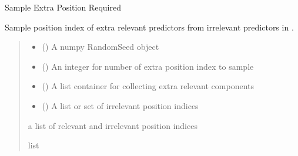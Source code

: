 \documentclass[letterpaper,10pt,english]{sphinxmanual}
\begin{document}

\begin{fulllineitems}
\label{\detokenize{Utilities:pysimrel.utilities.sample_extra_pos}}
\pysigstartsignatures
{}
\pysigstopsignatures
\sphinxAtStartPar
Sample Extra Position Required

\sphinxAtStartPar
Sample position index of extra relevant predictors from irrelevant predictors in .
\begin{quote}\begin{description}
\begin{itemize}
\item {} 
\sphinxAtStartPar
{} () \textendash{} A numpy RandomSeed object

\item {} 
\sphinxAtStartPar
{} () \textendash{} An integer for number of extra position index to sample

\item {} 
\sphinxAtStartPar
{} () \textendash{} A list container for collecting extra relevant components

\item {} 
\sphinxAtStartPar
{} () \textendash{} A list or set of irrelevant position indices

\end{itemize}

\sphinxAtStartPar
a list of relevant and irrelevant position indices

\sphinxAtStartPar
list

\end{description}\end{quote}

\end{fulllineitems}
\end{document}
